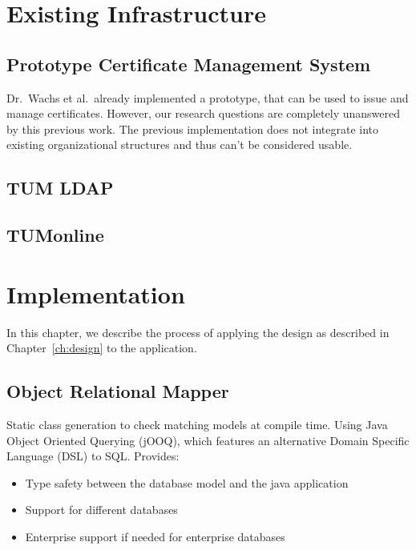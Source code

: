 \chapter{Existing Infrastructure}\label{ch:existingInfrastructure}
\section{Prototype Certificate Management System}\label{sec:existingCertificateManagementSystem}

Dr.\ Wachs et al.\ already implemented a prototype, that can be used to issue and manage certificates.
However, our research questions are completely unanswered by this previous work.
The previous implementation does not integrate into existing organizational structures and thus can't be considered
usable.

\section{TUM LDAP}\label{sec:tumLdap}

\section{TUMonline}\label{sec:tumonline}

\chapter{Implementation}\label{ch:implementation}

In this chapter, we describe the process of applying the design as described in Chapter~\ref{ch:design} to the
application.

\section{Object Relational Mapper}\label{sec:objectRelationalMapper}
Static class generation to check matching models at compile time.
Using Java Object Oriented Querying (jOOQ), which features an alternative Domain Specific Language (DSL) to SQL.
Provides:
\begin{itemize}
    \item Type safety between the database model and the java application
    \item Support for different databases
    \item Enterprise support if needed for enterprise databases
\end{itemize}

